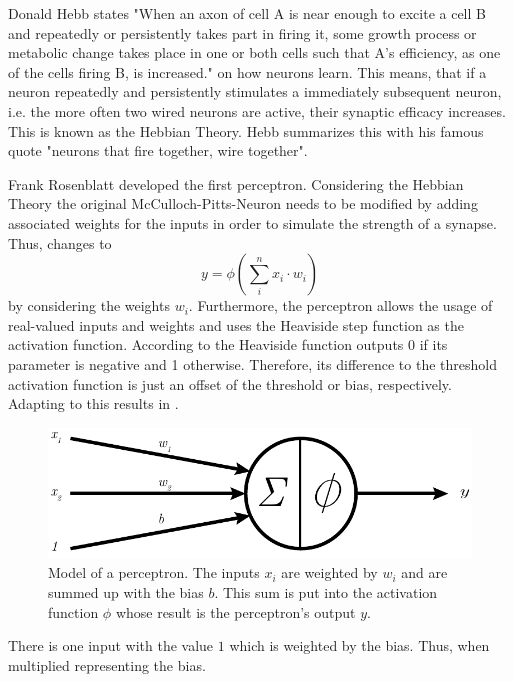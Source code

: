 Donald Hebb states "When an axon of cell A is near enough to excite a cell B and repeatedly or persistently takes part in firing it, some growth process or metabolic change takes place in one or both cells such that A's efficiency, as one of the cells firing B, is increased."\cite{Hebb1949} on how neurons learn.
This means, that if a neuron repeatedly and persistently stimulates a immediately subsequent neuron, i.e. the more often two wired neurons are active, their synaptic efficacy increases.
This is known as the Hebbian Theory.
Hebb summarizes this with his famous quote "neurons that fire together, wire together".

Frank Rosenblatt developed the first perceptron\cite{Rosenblatt58}.
Considering the Hebbian Theory the original McCulloch-Pitts-Neuron needs to be modified by adding associated weights for the inputs in order to simulate the strength of a synapse.
Thus,  changes to
\begin{equation}
	\label{eq:neuron}
	y = \phi \left( \sum_{i}^{n} x_i \cdot w_i \right)
\end{equation}
by considering the weights $w_i$.
Furthermore, the perceptron allows the usage of real-valued inputs and weights and uses the Heaviside step function as the activation function.
According to  the Heaviside function outputs 0 if its parameter is negative and 1 otherwise.
Therefore, its difference to the threshold activation function is just an offset of the threshold or bias, respectively.
Adapting  to this results in .
\begin{figure}
	\centering
	\includegraphics{images/perceptron}
	\caption[Model of a Perceptron]{Model of a perceptron. The inputs $x_i$ are weighted by $w_i$ and are summed up with the bias $b$. This sum is put into the activation function $\phi$ whose result is the perceptron's output $y$.}
	\label{fig:perceptron}
\end{figure}
There is one input with the value $1$ which is weighted by the bias.
Thus, when multiplied representing the bias.
